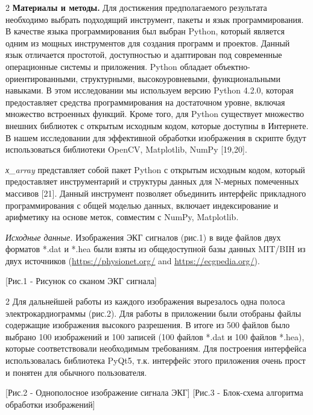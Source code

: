 \begin{multicols}{2}
{\bfseries Материалы и методы.} Для достижения предполагаемого результата
необходимо выбрать подходящий инструмент, пакеты и язык
программирования. В качестве языка программирования был выбран Python,
который является одним из мощных инструментов для создания программ и
проектов. Данный язык отличается простотой, доступностью и адаптирован
под современные операционные системы и приложения. Python обладает
объектно-ориентированными, структурными, высокоуровневыми,
функциональными навыками. В этом исследовании мы используем версию
Python 4.2.0, которая предоставляет средства программирования на
достаточном уровне, включая множество встроенных функций. Кроме того,
для Python существует множество внешних библиотек с открытым исходным
кодом, которые доступны в Интернете. В нашем исследовании для
эффективной обработки изображения в скрипте будут использоваться
библиотеки OpenCV, Matplotlib, NumPy {[}19,20{]}.

\emph{х\_array} представляет собой пакет Python с открытым исходным
кодом, который предоставляет инструментарий и структуры данных для
N-мерных помеченных массивов {[}21{]}. Данный инструмент позволяет
объединить интерфейс прикладного программирования с общей моделью
данных, включает индексирование и арифметику на основе меток, совместим
с NumPy, Matplotlib.

\emph{Исходные данные.} Изображения ЭКГ сигналов (рис.1) в виде файлов
двух форматов *.dat и *.hea были взяты из общедоступной базы данных
MIT/BIH из двух источников
(\href{https://physionet.org/}{\ul{https://physionet.org/}} and
\href{https://ecgpedia.org/}{\ul{https://ecgpedia.org/}}).
\end{multicols}

[Рис.1 - Рисунок со сканом ЭКГ сигнала]

\begin{multicols}{2}
Для дальнейшей работы из каждого изображения вырезалось одна полоса
электрокардиограммы (рис.2). Для работы в приложении были отобраны
файлы содержащие изображения высокого разрешения. В итоге из 500 файлов
было выбрано 100 изображений и 100 записей (100 файлов *.dat и 100
файлов *.hea), которые соответствовали необходимым требованиям. Для
построения интерфейса использовалась библиотека PyQt5, т.к. интерфейс
этого приложения очень прост и понятен для обычного пользователя.
\end{multicols}

[Рис.2 - Однополосное изображение сигнала ЭКГ]
[Рис.3 - Блок-схема алгоритма обработки изображений]

